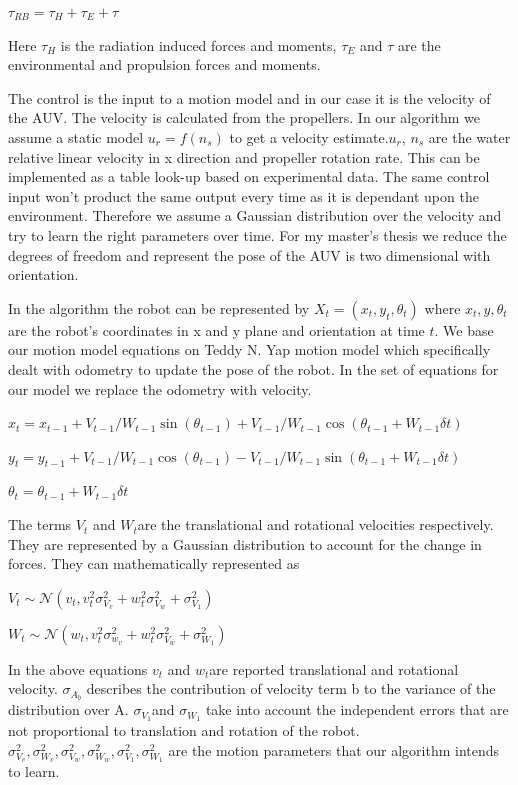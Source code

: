 \documentclass[12pt]{dalcsthesis}
\begin{document}
$\tau_{RB}=\tau_{H}+\tau_{E}+\tau$

Here $\tau_{H}$ is the radiation induced forces and moments, $\tau_{E}$
and $\tau$ are the environmental and propulsion forces and moments.

The control is the input to a motion model and in our case it is the velocity of the AUV. The velocity is calculated from the propellers. In our algorithm we assume a static model $u_{r}=f(n_{s})$ to get a velocity estimate.$u_{r}$, $n_{s}$ are the water relative linear velocity in x direction and propeller rotation rate. This can be implemented as a table look-up based on experimental data.
The same control input won't product the same output every time as it is dependant upon the environment. Therefore we assume a Gaussian distribution over the velocity and try to learn the right parameters over time. 
For my master's thesis we reduce the degrees of freedom and represent the pose of the AUV is two dimensional with orientation. 

In the algorithm the robot can be represented by $X_{t}=(x_{t},y_{t},\theta_{t})$
where $x_{t},y,\theta_{t}$ are the robot's coordinates in x and y
plane and orientation at time $t$. We base our motion model equations on Teddy N. Yap motion model which specifically dealt with odometry to update the pose of the robot. In the set of equations for our model we replace the odometry with velocity. 

$x_{t}=x_{t-1}+V_{t-1}/W_{t-1} \sin(\theta_{t-1})+ V_{t-1}/W_{t-1} \cos(\theta_{t-1} + W_{t-1} \delta t)$

$y_{t}=y_{t-1}+V_{t-1}/W_{t-1} \cos(\theta_{t-1})- V_{t-1}/W_{t-1} \sin(\theta_{t-1} + W_{t-1} \delta t)$

$\theta_{t}=\theta_{t-1}+ W_{t-1} \delta t$


The terms $V_{t}$ and $W_{t}$are the translational and rotational
velocities respectively. They are represented by a Gaussian distribution
to account for the change in forces. They can mathematically represented
as 

$V_{t}\sim\mathcal{{N}}(v_{t},v_{t}^{2}\sigma_{V_{v}}^{2}+w_{t}^{2}\sigma_{V_{w}}^{2}+\sigma_{V_{1}}^{2})$

$W_{t}\sim\mathcal{{N}}(w_{t},v_{t}^{2}\sigma_{w_{v}}^{2}+w_{t}^{2}\sigma_{V_{w}}^{2}+\sigma_{W_{1}}^{2})$

In the above equations $v_{t}$ and $w_{t}$are reported translational
and rotational velocity. $\sigma_{A_{b}}$ describes the contribution
of velocity term b to the variance of the distribution over A. $\sigma_{V_{1}}$and
$\sigma_{W_{1}}$ take into account the independent errors that are
not proportional to translation and rotation of the robot. $\sigma_{V_{v}}^{2}\ensuremath{,}\sigma_{W_{v}}^{2}\ensuremath{,}\sigma_{V_{w}}^{2}\ensuremath{,}\sigma_{W_{w}}^{2}\ensuremath{,}\sigma_{V_{1}}^{2}\ensuremath{,}\sigma_{W_{1}}^{2}$
are the motion parameters that our algorithm intends to learn.
\end{document}
